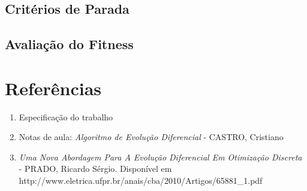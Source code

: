 \documentclass[12pt]{elsarticle}
\begin{document}
	\subsection{Critérios de Parada}
	
	
	\subsection{Avaliação do Fitness}
	
	\section{Referências}
	\begin{enumerate}
		\item Especificação do trabalho
		\item Notas de aula: \textit{Algoritmo de Evolução Diferencial} - CASTRO, Cristiano
		\item \textit{Uma Nova Abordagem Para A Evolução Diferencial Em Otimização Discreta} - PRADO, Ricardo Sérgio. Disponível em http://www.eletrica.ufpr.br/anais/cba/2010/Artigos/65881\_1.pdf
	\end{enumerate}
	
\end{document}
